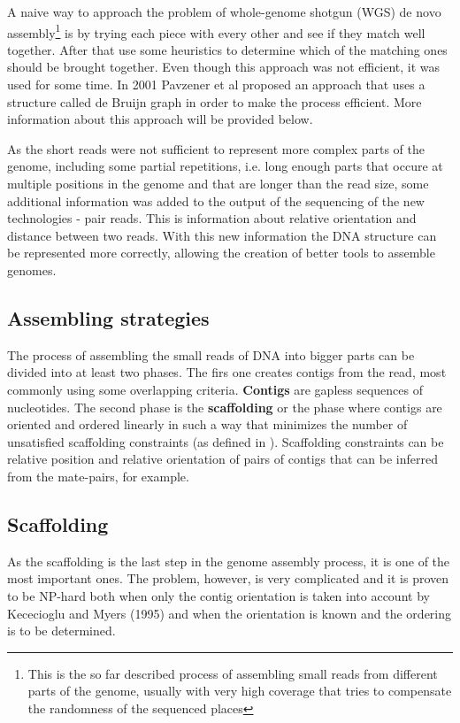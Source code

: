 \documentclass[11pt]{article}
\begin{document}
A naive way to approach the problem of whole-genome shotgun (WGS) de novo
assembly\footnote{This is the so far described process of assembling small reads
from different parts of the genome, usually with very high coverage that tries
to compensate the randomness of the sequenced places} is by trying each piece
with every other and see if they match well together. After that use some
heuristics to determine which of the matching ones should be brought together.
Even though this approach was not efficient, it was used for some time. In 2001
Pavzener et al \cite{pevzner-et-all-2001} proposed an approach that uses a structure
called de Bruijn graph in order to make the process efficient. More information
about this approach will be provided below.

As the short reads were not sufficient to represent more complex parts of the
genome, including some partial repetitions, i.e. long enough parts that occure at
multiple positions in the genome and that are longer than the read size, some additional information was
added to the output of the sequencing of the new technologies - pair reads. This
is information about relative orientation and distance between two reads. With
this new information the DNA structure can be represented more correctly,
allowing the creation of better tools to assemble genomes.


\subsection{Assembling strategies}
\label{sub:Assembling strategies}
The process of assembling the small reads of DNA into bigger parts can be
divided into at least two phases. The firs one creates contigs from the read,
most commonly using some overlapping criteria. \textbf{Contigs} are gapless
sequences of nucleotides. The second phase is the \textbf{scaffolding} or the
phase where contigs are oriented and ordered linearly in such a way that
minimizes the number of unsatisfied scaffolding constraints (as defined in
\cite{grass}). Scaffolding constraints can be relative position and relative
orientation of pairs of contigs that can be inferred from the mate-pairs, for
example.

\subsection{Scaffolding}
\label{sub:Scaffolding}
As the scaffolding is the last step in the genome assembly process, it is one of
the most important ones. The problem, however, is very complicated and it is proven 
to be NP-hard both when only the contig orientation is taken into account by Kececioglu and Myers (1995) \cite{NP-hard}
and when the orientation is known and the ordering is to be determined. 
\end{document}
